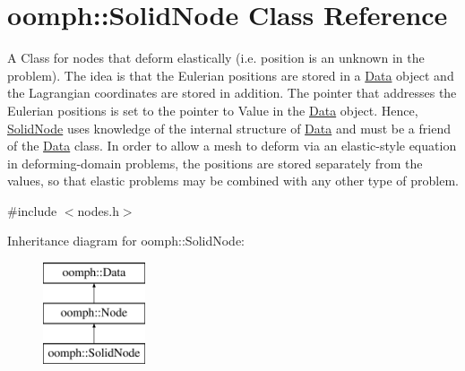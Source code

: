 \hypertarget{classoomph_1_1SolidNode}{}\section{oomph\+:\+:Solid\+Node Class Reference}
\label{classoomph_1_1SolidNode}


A Class for nodes that deform elastically (i.\+e. position is an unknown in the problem). The idea is that the Eulerian positions are stored in a \hyperlink{classoomph_1_1Data}{Data} object and the Lagrangian coordinates are stored in addition. The pointer that addresses the Eulerian positions is set to the pointer to Value in the \hyperlink{classoomph_1_1Data}{Data} object. Hence, \hyperlink{classoomph_1_1SolidNode}{Solid\+Node} uses knowledge of the internal structure of \hyperlink{classoomph_1_1Data}{Data} and must be a friend of the \hyperlink{classoomph_1_1Data}{Data} class. In order to allow a mesh to deform via an elastic-\/style equation in deforming-\/domain problems, the positions are stored separately from the values, so that elastic problems may be combined with any other type of problem.  




{\ttfamily \#include $<$nodes.\+h$>$}

Inheritance diagram for oomph\+:\+:Solid\+Node\+:\begin{figure}[H]
\begin{center}
\leavevmode
\includegraphics[height=3.000000cm]{classoomph_1_1SolidNode}
\end{center}
\end{figure}
